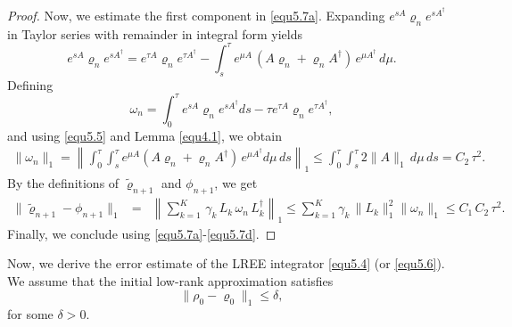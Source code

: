 \documentclass[preprint,3p,compress,12pt]{elsarticle}
\numberwithin{equation}{section}
\numberwithin{figure}{section}
\begin{document}
\begin{proof}
Now, we estimate the first component in \eqref{equ5.7a}.
Expanding $e^{sA}\varrho_ne^{sA^{\dag}}$ in Taylor series with remainder in integral form yields
\begin{equation*}
  e^{sA}\varrho_ne^{sA^{\dag}}=e^{\tau A}\varrho_ne^{\tau A^{\dag}}
  -\int_s^{\tau}e^{\mu A} \, (A\varrho_n+\varrho_n A^{\dag}) \, e^{\mu A^{\dag}} \, d\mu.
\end{equation*}
Defining
\[\omega_n=\int_0^{\tau}e^{sA}\varrho_ne^{sA^{\dag}}ds-\tau e^{\tau A}\varrho_ne^{\tau A^{\dag}},\]
and using \eqref{equ5.5} and Lemma \eqref{equ4.1}, we obtain
\begin{eqnarray*}
  \|\omega_n\|_1=\left\|\int_0^{\tau}\int_s^{\tau}e^{\mu A}(A\varrho_n+\varrho_n A^{\dag}) \, e^{\mu A^{\dag}}d\mu \, ds\right\|_1\leq \int_0^{\tau}\int_s^{\tau} 2\|A\|_1
  \, d\mu \, ds=C_2 \, \tau^2.
\end{eqnarray*}
By the definitions of $\tilde{\varrho}_{n+1}$ and $\phi_{n+1}$, we get
\begin{eqnarray}\label{equ5.7d}
  \|\tilde{\varrho}_{n+1}-\phi_{n+1}\|_1&=& \left\|\sum_{k=1}^K \, \gamma_k \, L_k\, \omega_n \, L_k^{\dag}\right\|_1
  \leq \sum_{k=1}^K\gamma_k \, \|L_k\|_1^2 \|\omega_n\|_1\leq C_1\, C_2 \, \tau^2.
\end{eqnarray}
Finally, we conclude using \eqref{equ5.7a}-\eqref{equ5.7d}.
\end{proof}

Now, we derive the error estimate of the LREE integrator \eqref{equ5.4} (or \eqref{equ5.6}).
We assume that the initial low-rank approximation satisfies
\[\|\rho_0-\varrho_0\|_1\leq\delta,\]
for some $\delta>0$.
\end{document}
